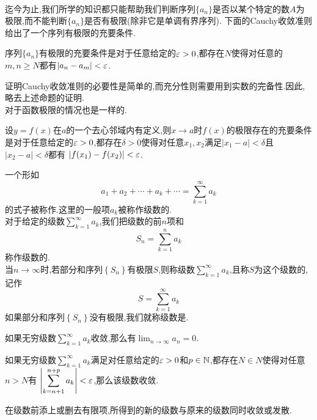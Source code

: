 \documentclass{ctexart}
\begin{document}
\pagestyle{empty}
\begin{center}\large{}\end{center}
\\
迄今为止,我们所学的知识都只能帮助我们判断序列$\{a_n\}$是否以某个特定的数$A$为极限,而不能判断$\{a_n\}$是否有极限(除非它是单调有界序列).%
下面的Cauchy收敛准则给出了一个序列有极限的充要条件.
\begin{formal}[1.1 Cauchy收敛准则]
    序列$\{a_n\}$有极限的充要条件是对于任意给定的$\varepsilon>0$,都存在$N$使得对任意的$m,n\geqslant N$都有$\left|a_n-a_m\right|<\varepsilon$.
\end{formal}\noindent
证明Cauchy收敛准则的必要性是简单的,而充分性则需要用到实数的完备性.因此,略去上述命题的证明.\\
对于函数极限的情况也是一样的.
\begin{formal}[1.2 Cauchy收敛准则]
    设$y=f(x)$在$a$的一个去心邻域内有定义,则$x\to a$时$f(x)$的极限存在的充要条件是对于任意给定的$\varepsilon>0$,都存在$\delta>0$使得对任意$x_1,x_2$满足$\left|x_1-a\right|<\delta$且$\left|x_2-a\right|<\delta$都有%
    $\left|f(x_1)-f(x_2)\right|<\varepsilon$.
\end{formal}
\noindent{}
\begin{definition}[2.1 定义:无穷级数及其敛散性]
    一个形如
    \[a_1+a_2+\cdots+a_k+\cdots=\sum_{k=1}^{\infty}a_k\]
    的式子被称作.这里的一般项$a_k$被称作级数的.\\
    对于给定的级数$\displaystyle\sum_{k=1}^{\infty}a_k$,我们把级数的前$n$项和
    \[S_n=\sum_{k=1}^{n}a_k\]
    称作级数的.\\
    当$n\to\infty$时,若部分和序列$\left\{S_n\right\}$有极限$S$,则称级数$\displaystyle\sum_{k=1}^\infty a_k$,且称$S$为这个级数的,记作
    \[S=\sum_{k=1}^\infty a_k\]
    如果部分和序列$\left\{S_n\right\}$没有极限,我们就称级数是.
\end{definition}
\begin{formal}[2.2 无穷级数收敛则通项趋于$0$]
    如果无穷级数$\displaystyle\sum_{k=1}^\infty a_k$收敛,那么有$\displaystyle\lim_{n\to\infty}a_n=0$.
\end{formal}
\begin{formal}
    如果无穷级数$\displaystyle\sum_{k=1}^\infty a_k$满足对任意给定的$\varepsilon>0$和$p\in\mathbb{N}$,都存在$N\in N$使得对任意$n>N$有%
    \(\displaystyle\left|\sum_{k=n+1}^{n+p}a_k\right|<\varepsilon\),那么该级数收敛.
\end{formal}
\begin{formal}[2.4 修改级数的有限项不改变其敛散性]
    在级数前添上或删去有限项,所得到的新的级数与原来的级数同时收敛或发散.
\end{formal}
\end{document}
